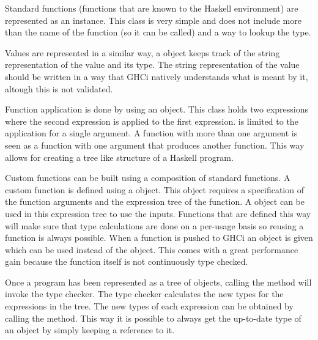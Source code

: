 Standard functions (functions that are known to the Haskell environment) are represented as an  instance. 
This class is very simple and does not include more than the name of the function (so it can be called) and a way to lookup the type.

Values are represented in a similar way, a  object keeps track of the string representation of the value and its type. 
The string representation of the value should be written in a way that GHCi natively understands what is meant by it, altough this is not validated.

Function application is done by using an  object. 
This class holds two expressions where the second expression is applied to the first expression.
 is limited to the application for a single argument.
A function with more than one argument is seen as a function with one argument that produces another function.
This way  allows for creating a tree like structure of a Haskell program.

Custom functions can be built using a composition of standard functions.
A custom function is defined using a  object.
This object requires a specification of the function arguments and the expression tree of the function.
A  object can be used in this expression tree to use the inputs.
Functions that are defined this way will make sure that type calculations are done on a per-usage basis so reusing a function is always possible.
When a function is pushed to GHCi an  object is given which can be used instead of the  object.
This comes with a great performance gain because the function itself is not continuously type checked.

Once a program has been represented as a tree of  objects, calling the  method will invoke the type checker.
The type checker calculates the new types for the expressions in the tree.
The new types of each expression can be obtained by calling the  method.
This way it is possible to always get the up-to-date type of an  object by simply keeping a reference to it.

